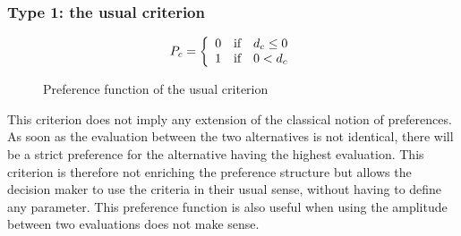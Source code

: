 \subsubsection{Type 1: the usual criterion}
\begin{figure}[H]
\begin{minipage}{.5\textwidth}
    \begin{center}
    \end{center}
\end{minipage}%
\begin{minipage}{.5\textwidth}
    \begin{equation}
        P_c = \left\{
            \begin{array}{l c c}
                0 & \text{if} & d_{c} \le 0 \\
                1 & \text{if} & 0 < d_c \\
            \end{array}
            \right .
        \label{eq:type1_criterion}
    \end{equation}
\end{minipage}
\caption{Preference function of the usual criterion}
\end{figure}

This criterion does not imply any extension of the classical notion of preferences. As soon as the evaluation between the two alternatives is not identical, there will be a strict preference for the alternative having the highest evaluation.
This criterion is therefore not enriching the preference structure but allows the decision maker to use the criteria in their usual sense, without having to define any parameter. 
This preference function is also useful when using the amplitude between two evaluations does not make sense. 

